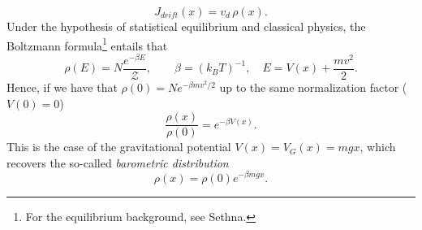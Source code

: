 \begin{equation}
J_{drift}(x)=v_d\,\rho(x).
\end{equation}
Under the hypothesis of statistical equilibrium and classical physics, the Boltzmann formula\footnote{For the equilibrium background, see Sethna\cite{Sethna2021}.} entails that
\begin{equation}
\rho(E)=N\frac{e^{-\beta E}}{\mathcal{Z}}, \qquad \beta=(k_BT)^{-1}, \quad E=V(x)+\frac{mv^2}{2}.
\end{equation}
Hence, if we have that $\rho(0)=Ne^{-\beta m v^2/2}$ up to the same normalization factor ($V(0)=0$)
\begin{equation}
	\frac{\rho(x)}{\rho(0)}=e^{-\beta V(x)}.
\end{equation}
This is the case of the gravitational potential $V(x)=V_G(x)=mgx$, which recovers the so-called \textit{barometric distribution}
\begin{equation}
\rho(x)=\rho(0)e^{-\beta m g x}.
\end{equation}

